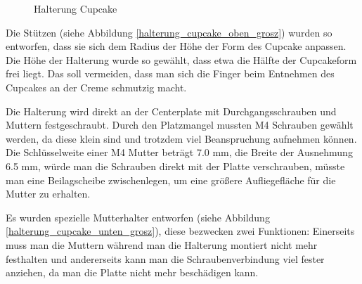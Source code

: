 			\begin{figure}[H]
			  \begin{centering}
			  \par\end{centering}
			  \caption{Halterung Cupcake}
			  \label{Halterung_Cupcake}
			\end{figure}

	Die Stützen (siehe Abbildung \ref{halterung_cupcake_oben_grosz}) wurden so entworfen, dass sie sich dem Radius \bzw der Höhe der Form des Cupcake anpassen.
	Die Höhe der Halterung wurde so gewählt, dass etwa die Hälfte der Cupcakeform frei liegt.
	Das soll vermeiden, dass man sich die Finger beim Entnehmen des Cupcakes an der Creme schmutzig macht.

	Die Halterung wird direkt an der Centerplate mit Durchgangsschrauben und Muttern festgeschraubt.
	Durch den Platzmangel mussten M4 Schrauben gewählt werden, da diese klein sind und trotzdem viel Beanspruchung aufnehmen können.
	Die Schlüsselweite einer M4 Mutter beträgt 7.0 mm, die Breite der Ausnehmung 6.5 mm, würde man die Schrauben direkt mit der Platte verschrauben, müsste man eine Beilagscheibe zwischenlegen, um eine größere Aufliegefläche für die Mutter zu erhalten.

	Es wurden spezielle Mutterhalter entworfen (siehe Abbildung \ref{halterung_cupcake_unten_grosz}), diese bezwecken zwei Funktionen:
	Einerseits muss man die Muttern während man die Halterung montiert nicht mehr festhalten und andererseits kann man die Schraubenverbindung viel fester anziehen, da man die Platte nicht mehr beschädigen kann.

